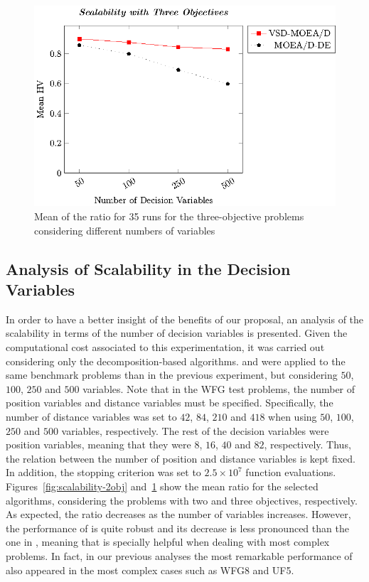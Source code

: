 \begin{figure}[t]
\centering
\includegraphics[scale=0.75]{images/Graphic-Scalability-3obj_tikz-figure0.eps}
\caption{Mean of the \HV{} ratio for 35 runs for the three-objective problems considering different numbers of variables} \label{fig:scalability-3obj}
\end{figure}

\subsection{Analysis of Scalability in the Decision Variables}

In order to have a better insight of the benefits of our proposal, an analysis of the scalability in terms of the number 
of decision variables is presented.
%
Given the computational cost associated to this experimentation, it was carried out considering only 
the decomposition-based algorithms.
%
\AVSDMOEAD{} and \MOEADDE{} were applied to the same benchmark problems than in the previous experiment, 
but considering $50$, $100$, $250$ and $500$ variables.
%
Note that in the WFG test problems, the number of position variables and distance variables must be specified.
%
Specifically, the number of distance variables was set to $42$, $84$, $210$ and $418$ when using $50$, $100$, $250$ and $500$ 
variables, respectively.
%
The rest of the decision variables were position variables, meaning that they were $8$, $16$, $40$ and $82$, respectively.
%
Thus, the relation between the number of position and distance variables is kept fixed.
%
In addition, the stopping criterion was set to $2.5 \times 10^7$ function evaluations.
%
Figures~\ref{fig:scalability-2obj} and~\ref{fig:scalability-3obj} show the mean \HV{} ratio for the selected algorithms, 
considering the problems with two and three objectives, respectively.
%
As expected, the \HV{} ratio decreases as the number of variables increases.
%
However, the performance of \AVSDMOEAD{} is quite robust and its decrease is less pronounced than the one in \MOEADDE{},
meaning that \AVSDMOEAD{} is specially helpful when dealing with most complex problems.
%
In fact, in our previous analyses the most remarkable performance of \AVSDMOEAD{} also appeared in the most complex cases such
as WFG8 and UF5.
%



